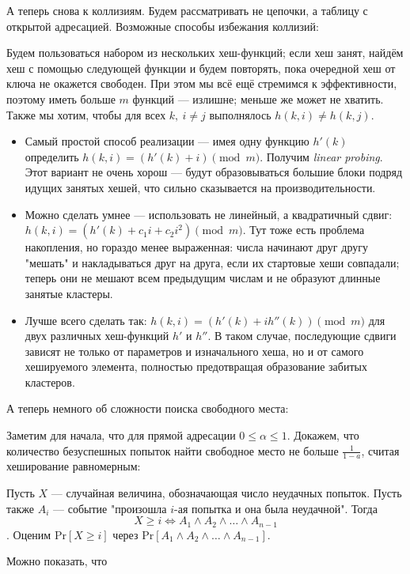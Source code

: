\documentclass[a4paper,12pt]{article}
\begin{document}
А теперь снова к коллизиям. Будем рассматривать не цепочки, а таблицу с открытой адресацией. Возможные способы избежания коллизий:

Будем пользоваться набором из нескольких хеш-функций; если хеш занят, найдём хеш с помощью следующей функции и будем повторять, пока очередной хеш от ключа не окажется свободен. При этом мы всё ещё стремимся к эффективности, поэтому иметь больше $m$ функций --- излишне; меньше же может не хватить. Также мы хотим, чтобы для всех $k,\ i\neq j$ выполнялось $h(k, i) \neq h(k, j)$.
\begin{itemize}
\item
    Самый простой способ реализации --- имея одну функцию $h'(k)$ определить $h(k, i) = (h'(k) + i) \pmod{m}$. Получим \emph{linear probing}. Этот вариант не очень хорош --- будут образовываться большие блоки подряд идущих занятых хешей, что сильно сказывается на производительности.
    
\item
    Можно сделать умнее --- использовать не линейный, а квадратичный сдвиг: $h(k, i) = (h'(k) + c_1i+c_2i^2) \pmod{m}$. Тут тоже есть проблема накопления, но гораздо менее выраженная: числа начинают друг другу "мешать" и накладываться друг на друга, если их стартовые хеши совпадали; теперь они не мешают всем предыдущим числам и не образуют длинные занятые кластеры.
    
\item
    Лучше всего сделать так: $h(k, i) = (h'(k) + ih''(k)) \pmod{m}$ для двух различных хеш-функций $h'$ и $h''$. В таком случае, последующие сдвиги зависят не только от параметров и изначального хеша, но и от самого хешируемого элемента, полностью предотвращая образование забитых кластеров.
\end{itemize}


А теперь немного об сложности поиска свободного места:

Заметим для начала, что для прямой адресации $0 \leqslant \alpha \leqslant 1$. Докажем, что количество безуспешных попыток найти свободное место не больше $\frac{1}{1-a}$, считая хеширование равномерным:

Пусть $X$ --- случайная величина, обозначающая число неудачных попыток. Пусть также $A_i$ --- событие "произошла $i$-ая попытка и она была неудачной". Тогда \[X \geqslant i \iff A_1 \land A_2 \land \ldots \land A_{n-1}\]. Оценим $\mathrm{Pr}[X \geqslant i]$ через $\mathrm{Pr}[A_1 \land A_2 \land \ldots \land A_{n-1}]$.

Можно показать, что 
\end{document}
